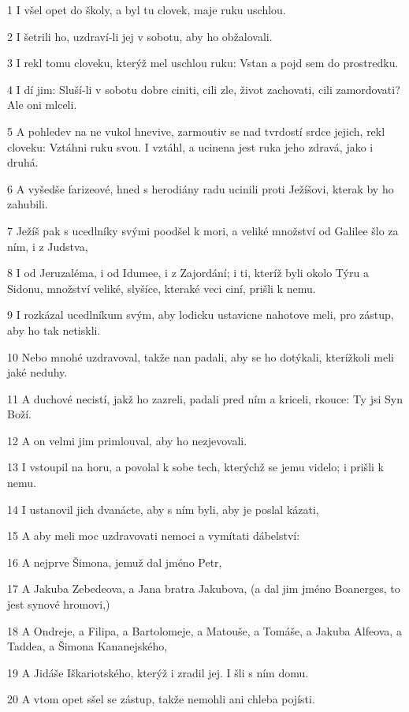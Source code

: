 \par 1 I všel opet do školy, a byl tu clovek, maje ruku uschlou.
\par 2 I šetrili ho, uzdraví-li jej v sobotu, aby ho obžalovali.
\par 3 I rekl tomu cloveku, kterýž mel uschlou ruku: Vstan a pojd sem do prostredku.
\par 4 I dí jim: Sluší-li v sobotu dobre ciniti, cili zle, život zachovati, cili zamordovati? Ale oni mlceli.
\par 5 A pohledev na ne vukol hnevive, zarmoutiv se nad tvrdostí srdce jejich, rekl cloveku: Vztáhni ruku svou. I vztáhl, a ucinena jest ruka jeho zdravá, jako i druhá.
\par 6 A vyšedše farizeové, hned s herodiány radu ucinili proti Ježíšovi, kterak by ho zahubili.
\par 7 Ježíš pak s ucedlníky svými poodšel k mori, a veliké množství od Galilee šlo za ním, i z Judstva,
\par 8 I od Jeruzaléma, i od Idumee, i z Zajordání; i ti, kteríž byli okolo Týru a Sidonu, množství veliké, slyšíce, kteraké veci ciní, prišli k nemu.
\par 9 I rozkázal ucedlníkum svým, aby lodicku ustavicne nahotove meli, pro zástup, aby ho tak netiskli.
\par 10 Nebo mnohé uzdravoval, takže nan padali, aby se ho dotýkali, kterížkoli meli jaké neduhy.
\par 11 A duchové necistí, jakž ho zazreli, padali pred ním a kriceli, rkouce: Ty jsi Syn Boží.
\par 12 A on velmi jim primlouval, aby ho nezjevovali.
\par 13 I vstoupil na horu, a povolal k sobe tech, kterýchž se jemu videlo; i prišli k nemu.
\par 14 I ustanovil jich dvanácte, aby s ním byli, aby je poslal kázati,
\par 15 A aby meli moc uzdravovati nemoci a vymítati dábelství:
\par 16 A nejprve Šimona, jemuž dal jméno Petr,
\par 17 A Jakuba Zebedeova, a Jana bratra Jakubova, (a dal jim jméno Boanerges, to jest synové hromovi,)
\par 18 A Ondreje, a Filipa, a Bartolomeje, a Matouše, a Tomáše, a Jakuba Alfeova, a Taddea, a Šimona Kananejského,
\par 19 A Jidáše Iškariotského, kterýž i zradil jej. I šli s ním domu.
\par 20 A vtom opet sšel se zástup, takže nemohli ani chleba pojísti.
